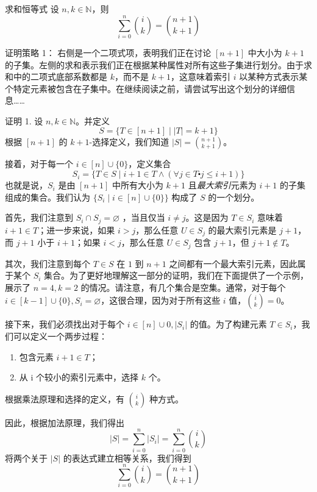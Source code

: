 \begin{theorem}{求和恒等式}\label{theorem8.4.5}
    设 $n,k \in \mathbb{N}$，则
    \[\sum_{i=0}^{n} {i \choose k} = {n+1 \choose k+1}\]
\end{theorem}

\begin{questions}{证明策略 1：}
    右侧是一个二项式项，表明我们正在讨论 $[n+1]$ 中大小为 $k+1$ 的子集。左侧的求和表示我们正在根据某种属性对所有这些子集进行划分。由于求和中的二项式底部系数都是 $k$，而不是 $k+1$，这意味着索引 $i$ 以某种方式表示某个特定元素被包含在子集中。在继续阅读之前，请尝试写出这个划分的详细信息……
\end{questions}

\begin{proofs}{证明 1.}
    设 $n,k \in \mathbb{N}$。并定义
    \[S = \{T \in [n + 1] \mid |T| = k + 1\}\]
    根据 $[n+1]$ 的 $k+1$-选择定义，我们知道 $|S| = {n+1 \choose k+1}$。

    接着，对于每一个 $i \in [n] \cup \{0\}$，定义集合
    \[S_i = \{T \in S \mid i + 1 \in T \land (\forall j \in T \centerdot j \le i + 1)\}\]
    也就是说，$S_i$ 是由 $[n + 1]$ 中所有大小为 $k + 1$ 且\emph{最大索引}元素为 $i + 1$ 的子集组成的集合。我们认为 $\{S_i \mid i \in [n] \cup \{0\}\}$ 构成了 $S$ 的一个划分。

    首先，我们注意到 $S_i \cap S_j = \varnothing$ ，当且仅当 $i \ne j$。这是因为 $T ∈ S_i$ 意味着 $i + 1 \in T$；进一步来说，如果 $i > j$，那么任意 $U \in S_j$ 的最大索引元素是 $j + 1$，而 $j + 1$ 小于 $i + 1$；如果 $i < j$，那么任意 $U ∈ S_j$ 包含 $j + 1$，但 $j + 1 \notin T$。

    其次，我们注意到每个 $T \in S$ 在 $1$ 到 $n + 1$ 之间都有一个最大索引元素，因此属于某个 $S_i$ 集合。为了更好地理解这一部分的证明，我们在下面提供了一个示例，展示了 $n = 4, k = 2$ 的情况。请注意，有几个集合是空集。通常，对于每个 $i \in [k - 1] \cup \{0\}, S_i=\varnothing$，这很合理，因为对于所有这些 $i$ 值，${i \choose k}=0$。

    接下来，我们必须找出对于每个 $i \in [n] \cup {0}, |S_i|$ 的值。为了构建元素 $T \in S_i$，我们可以定义一个两步过程：
    \begin{enumerate}[label=(\arabic*)]
        \item 包含元素 $i + 1 \in T$；
        \item 从 i 个较小的索引元素中，选择 $k$ 个。
    \end{enumerate}
    根据乘法原理和选择的定义，有 ${i \choose k}$ 种方式。

    因此，根据加法原理，我们得出
    \[|S| = \sum_{i=0}^{n} |S_i| = \sum_{i=0}^{n} {i \choose k}\]
    将两个关于 $|S|$ 的表达式建立相等关系，我们得到
    \[\sum_{i=0}^{n} {i \choose k} = {n+1 \choose k+1}\]
\end{proofs}


